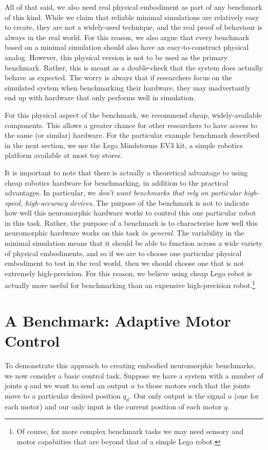 \documentclass{frontiersSCNS} %
\begin{document}
All of that said, we also need real physical embodiment as part of any
benchmark of this kind.  While we claim that reliable minimal simulations
are relatively easy to create, they are not a widely-used technique, and the
real proof of behaviour is always in the real world.  For this reason, we
also argue that every benchmark based on a minimal simulation should also
have an easy-to-construct physical analog.  However, this physical version
is not to be used as the primary benchmark.  Rather, this is meant as a
double-check that the system does actually behave as expected.  The worry
is always that if researchers focus on the simulated system when benchmarking
their hardware, they may inadvertantly end up with hardware that only performs
well in simulation.  

For this physical aspect of the benchmark, we recommend cheap, widely-available
components.  This allows a greater chance for other researchers to have
access to the same (or similar) hardware.  For the particular example 
benchmark described in the next section, we use the Lego Mindstorms EV3 kit,
a simple robotics platform available at most toy stores.

It is important to note that there is actually a theoretical advantage to
using cheap robotics hardware for benchmarking, in addition to the practical
advantages.  In particular, we \emph{don't want benchmarks that rely on
particular high-speed, high-accuracy devices}.  The purpose of the benchmark
is not to indicate how well this neuromorphic hardware works to control this
one particular robot in this task.  Rather, the purpose of a benchmark is to
characterise how well this neuromorphic hardware works on this task 
\emph{in general}.  The variability in the minimal simulation means that it
should be able to function across a wide variety of physical embodiments, and
so if we are to choose one particular physical embodiment to test in the
real world, then we should choose one that is not extremely high-precision.
For this reason, we believe using cheap Lego robot is actually more useful
for benchmarking than an expensive high-precision robot.\footnote{Of course,
for more complex benchmark tasks we may need sensory and motor capabiities
that are beyond that of a simple Lego robot.}

\section{A Benchmark: Adaptive Motor Control}

To demonstrate this approach to creating embodied neuromorphic benchmarks,
we now consider a basic control task.  Suppose we have a system with a number
of joints $q$ and we want to send an output $u$ to those motors such that
the joints move to a particular desired position $q_d$.  Our only output is
the signal $u$ (one for each motor) and our only input is the current position
of each motor $q$.
\end{document}
